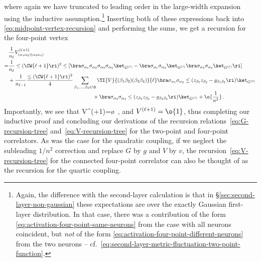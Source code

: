 where again we have truncated to leading order in the large-width expansion using the inductive assumption.\footnote{Again, the difference with the second-layer calculation is that in \S\ref{sec:second-layer-non-gaussian} these expectations are over the exactly Gaussian first-layer distribution. In that case, there was a contribution of the form \eqref{eq:activation-four-point-same-neurons} from the case with all neurons coincident, but \emph{not} of the form \eqref{eq:activation-four-point-different-neurons} from the two neurons -- cf.~\eqref{eq:second-layer-metric-fluctuation-two-point-function}.}
Inserting both of these expressions back into \eqref{eq:midpoint-vertex-recursion} and performing the sums, we get a recursion for the four-point vertex
\begin{align}\label{eq:V-recursion-tree}
&\frac{1}{n_{\ell}}V^{(\ell+1)}_{(\alpha_1\alpha_2)(\alpha_3\alpha_4)}\, \\
=&\frac{1}{n_{\ell}} \le(\CW{\ell+1}\ri)^2\le[\bra\sigma_{\alpha_1} \sigma_{\alpha_2} \sigma_{\alpha_3} \sigma_{\alpha_4}\ket_{G^{(\ell)}}  - \bra \sigma_{\alpha_1} \sigma_{\alpha_2}\ket_{G^{(\ell)}} \bra \sigma_{\alpha_3} \sigma_{\alpha_4}\ket_{G^{(\ell)}} \ri]\, \nonumber\\
&+\frac{1}{n_{\ell-1}}\frac{\le(\CW{\ell+1}\ri)^2}{4}\sum_{\beta_1,\ldots,\beta_4\in\D}\TI{V}{(\beta_1\beta_2)(\beta_3\beta_4)}{\ell}\bra\sigma_{\alpha_1}\sigma_{\alpha_2} \le(z_{\beta_1} z_{\beta_2}-g_{\beta_1\beta_2}\ri)\ket_{G^{(\ell)}}\, \nonumber\\
&\quad \quad \quad \quad \quad \quad \quad \quad \quad \quad \quad \quad \quad \quad \quad \quad \times\bra \sigma_{\alpha_3}\sigma_{\alpha_4} \le(z_{\beta_3} z_{\beta_4}-g_{\beta_3\beta_4}\ri)\ket_{G^{(\ell)}}+\o{\frac{1}{n^2}} \, . \nonumber
\end{align}
Importantly, we see that
\be\label{eq:V-recursion-tree-redux}
V^{(\ell+1)}=\o{}\, ,
\ee
and $V^{(\ell+1)}=\o{1}$, thus completing our inductive proof and concluding our derivations of the recursion relations~\eqref{eq:G-recursion-tree} and~\eqref{eq:V-recursion-tree} for the two-point and four-point correlators.
As was the case for the quadratic coupling,  if we neglect the subleading $1/n^2$ correction and replace $G$ by $g$ and $V$ by $v$, the recursion~\eqref{eq:V-recursion-tree} for the connected four-point correlator can also be thought of as the recursion for the quartic coupling. 



